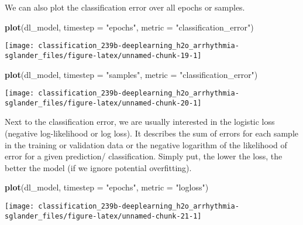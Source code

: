 \documentclass[]{book}
\newenvironment{Shaded}{\begin{snugshade}}{\end{snugshade}}
\newcommand{\DataTypeTok}[1]{\textcolor[rgb]{0.13,0.29,0.53}{#1}}
\newcommand{\KeywordTok}[1]{\textcolor[rgb]{0.13,0.29,0.53}{\textbf{#1}}}
\newcommand{\NormalTok}[1]{#1}
\newcommand{\StringTok}[1]{\textcolor[rgb]{0.31,0.60,0.02}{#1}}
\begin{document}
We can also plot the classification error over all epochs or samples.

\begin{Shaded}
\begin{Highlighting}[]
\KeywordTok{plot}\NormalTok{(dl_model,}
     \DataTypeTok{timestep =} \StringTok{"epochs"}\NormalTok{,}
     \DataTypeTok{metric =} \StringTok{"classification_error"}\NormalTok{)}
\end{Highlighting}
\end{Shaded}

\begin{center}\texttt{[image: classification\_239b-deeplearning\_h2o\_arrhythmia-sglander\_files/figure-latex/unnamed-chunk-19-1]} \end{center}

\begin{Shaded}
\begin{Highlighting}[]
\KeywordTok{plot}\NormalTok{(dl_model,}
     \DataTypeTok{timestep =} \StringTok{"samples"}\NormalTok{,}
     \DataTypeTok{metric =} \StringTok{"classification_error"}\NormalTok{)}
\end{Highlighting}
\end{Shaded}

\begin{center}\texttt{[image: classification\_239b-deeplearning\_h2o\_arrhythmia-sglander\_files/figure-latex/unnamed-chunk-20-1]} \end{center}

Next to the classification error, we are usually interested in the logistic loss (negative log-likelihood or log loss). It describes the sum of errors for each sample in the training or validation data or the negative logarithm of the likelihood of error for a given prediction/ classification. Simply put, the lower the loss, the better the model (if we ignore potential overfitting).

\begin{Shaded}
\begin{Highlighting}[]
\KeywordTok{plot}\NormalTok{(dl_model,}
     \DataTypeTok{timestep =} \StringTok{"epochs"}\NormalTok{,}
     \DataTypeTok{metric =} \StringTok{"logloss"}\NormalTok{)}
\end{Highlighting}
\end{Shaded}

\begin{center}\texttt{[image: classification\_239b-deeplearning\_h2o\_arrhythmia-sglander\_files/figure-latex/unnamed-chunk-21-1]} \end{center}
\end{document}
